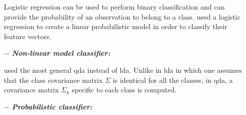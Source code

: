 \begin{enumerate}[leftmargin=*]
Logistic regression can be used to perform binary classification and can provide the probability of an observation to belong to a class. %
%
%
%
%
%
\cite{Kelm2007,Puech2009} used a logistic regression to create a linear probabilistic model in order to classify their feature vectors.

\item[$-$] \textbf{\textit{Non-linear model classifier:}} 

\cite{Viswanath2012} used the most general \acf{qda} instead of \ac{lda}. Unlike in \ac{lda} in which one assumes that the class covariance matrix $\Sigma$ is identical for all the classes, in \ac{qda}, a covariance matrix $\Sigma_k$ specific to each class is computed.%
%
%

\item[$-$] \textbf{\textit{Probabilistic classifier:}}


\end{enumerate}
